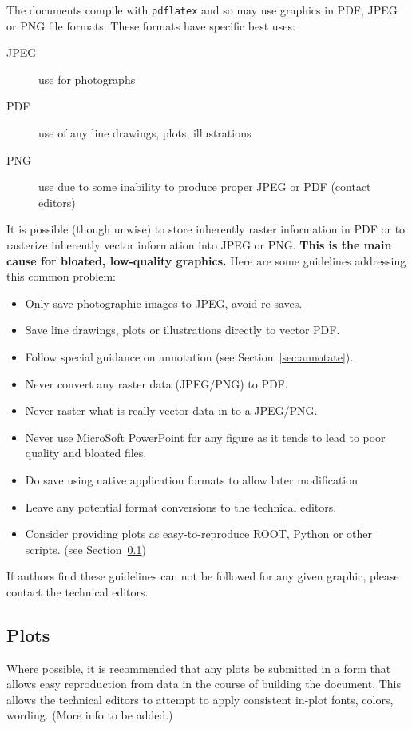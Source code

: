 The documents compile with \texttt{pdflatex} and so may use graphics
in PDF, JPEG or PNG file formats.
These formats have specific best uses:

\begin{description}
\item[JPEG] use for photographs
\item[PDF] use of any line drawings, plots, illustrations
\item[PNG] use due to some inability to produce proper JPEG or PDF (contact editors)
\end{description}

It is possible (though unwise) to store inherently raster information
in PDF or to rasterize inherently vector information into JPEG or PNG.
\textbf{This is the main cause for bloated, low-quality graphics.}
Here are some guidelines addressing this common problem:

\begin{itemize}
\item Only save photographic images to JPEG, avoid re-saves.
\item Save line drawings, plots or illustrations directly to vector PDF.
\item Follow special guidance on annotation (see Section~\ref{sec:annotate}).
\item Never convert any raster data (JPEG/PNG) to PDF.
\item Never raster what is really vector data in to a JPEG/PNG.
\item Never use MicroSoft PowerPoint for any figure as it tends to lead to poor quality and bloated files.
\item Do save using native application formats to allow later
  modification
\item Leave any potential format conversions to the technical editors.
\item Consider providing plots as easy-to-reproduce ROOT, Python or
  other scripts.
  (see Section~\ref{sec:plots})
\end{itemize}

\noindent If authors find these guidelines can not be followed for any
given graphic, please contact the technical editors.   

\subsection{Plots}
\label{sec:plots}

Where possible, it is recommended that any plots be submitted in a
form that allows easy reproduction from data in the course of building
the document.
This allows the technical editors to attempt to apply consistent
in-plot fonts, colors, wording.
(More info to be added.)

